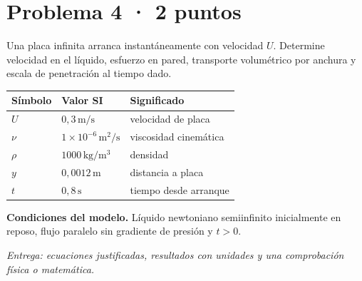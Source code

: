 \par\medskip\noindent\begin{minipage}{\linewidth}

\section{Problema 4 · 2 puntos}

Una placa infinita arranca instantáneamente con velocidad $U$. Determine velocidad en el líquido, esfuerzo en pared, transporte volumétrico por anchura y escala de penetración al tiempo dado.

\begin{tabular}{@{}p{.15\linewidth}p{.23\linewidth}p{.54\linewidth}@{}}
\toprule Símbolo & Valor SI & Significado\\\midrule
$U$ & $0{,}3\,\mathrm{m/s}$ & velocidad de placa\\
$\nu$ & $1\times10^{-6}\,\mathrm{m^2/s}$ & viscosidad cinemática\\
$\rho$ & $1000\,\mathrm{kg/m^3}$ & densidad\\
$y$ & $0{,}0012\,\mathrm{m}$ & distancia a placa\\
$t$ & $0{,}8\,\mathrm{s}$ & tiempo desde arranque\\
\bottomrule\end{tabular}

\par\medskip\textbf{Condiciones del modelo.} Líquido newtoniano semiinfinito inicialmente en reposo, flujo paralelo sin gradiente de presión y $t>0$.

\par\textit{Entrega: ecuaciones justificadas, resultados con unidades y una comprobación física o matemática.}

\end{minipage}\par\medskip

